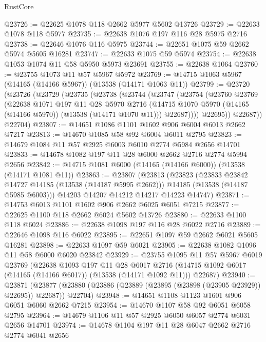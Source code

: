 \begin{lexlean}{RustCore}
\begin{coremodule}
@23726 := @22625 @1078 @118 @2662 @5977 @5602 @13726
@23729 := @22633 @1078 @118 @5977
@23735 := @22638 @1076 @197 @116 @28 @5975 @2716
@23738 := @22646 @1076 @116 @5975
@23744 := @22651 @1075 @59 @2662 @5974 @5605 @16281
@23747 := @22633 @1075 @59 @5974
@23754 := @22638 @1053 @1074 @11 @58 @5950 @5973 @23691
@23755 := @22638 @1064
@23760 := @23755 @1073 @11 @57 @5967 @5972
@23769 := @14715 @1063 @5967 (@14165 (@14166 @5967)) (@13538 (@14171 @1063 @11))
@23799 := @23720
    (@23726
      (@23729
        (@23735
          (@23738
            (@23744
              (@23747
                (@23754
                  (@23760
                    @23769
                    (@22638
                      @1071
                      @197
                      @11
                      @28
                      @5970
                      @2716
                      (@14715 @1070 @5970 (@14165 (@14166 @5970)) (@13538 (@14171 @1070 @11)))
                      @22687))))
              @22695))
          @22687))
      @22704)
@23807 := @14651 @1086 @1101 @1602 @906 @6004 @6013 @2662 @7217
@23813 := @14670 @1085 @58 @92 @6004 @6011 @2795
@23823 := @14679 @1084 @11 @57 @2925 @6003 @6010 @2774 @5984 @2656 @14701
@23833 := @14678 @1082 @197 @11 @28 @6000 @2662 @2716 @2774 @5994 @2656
@23842 := @14715 @1081 @6000 (@14165 (@14166 @6000)) (@13538 (@14171 @1081 @11))
@23863 := @23807
    (@23813
      (@23823
        (@23833 @23842 @14727 @14185 (@13538 (@14187 @5995 @2662)))
        @14185
        (@13538 (@14187 @5985 @6003)))
      @14203
      @14207
      @14212
      @14217
      @14223
      @14747)
@23871 := @14753 @6013 @1101 @1602 @906 @2662 @6025 @6051 @7215
@23877 := @22625 @1100 @118 @2662 @6024 @5602 @13726
@23880 := @22633 @1100 @118 @6024
@23886 := @22638 @1098 @197 @116 @28 @6022 @2716
@23889 := @22646 @1098 @116 @6022
@23895 := @22651 @1097 @59 @2662 @6021 @5605 @16281
@23898 := @22633 @1097 @59 @6021
@23905 := @22638 @1082 @1096 @11 @58 @6000 @6020 @23842
@23929 := @23755
    @1095
    @11
    @57
    @5967
    @6019
    @23769
    (@22638
      @1093
      @197
      @11
      @28
      @6017
      @2716
      (@14715 @1092 @6017 (@14165 (@14166 @6017)) (@13538 (@14171 @1092 @11)))
      @22687)
@23940 := @23871
    (@23877 (@23880 (@23886 (@23889 (@23895 (@23898 (@23905 @23929)) @22695)) @22687)) @22704)
@23948 := @14651 @1108 @1123 @1601 @906 @6051 @6060 @2662 @7215
@23954 := @14670 @1107 @58 @92 @6051 @6058 @2795
@23964 := @14679 @1106 @11 @57 @2925 @6050 @6057 @2774 @6031 @2656 @14701
@23974 := @14678 @1104 @197 @11 @28 @6047 @2662 @2716 @2774 @6041 @2656

\end{coremodule}
\end{lexlean}
